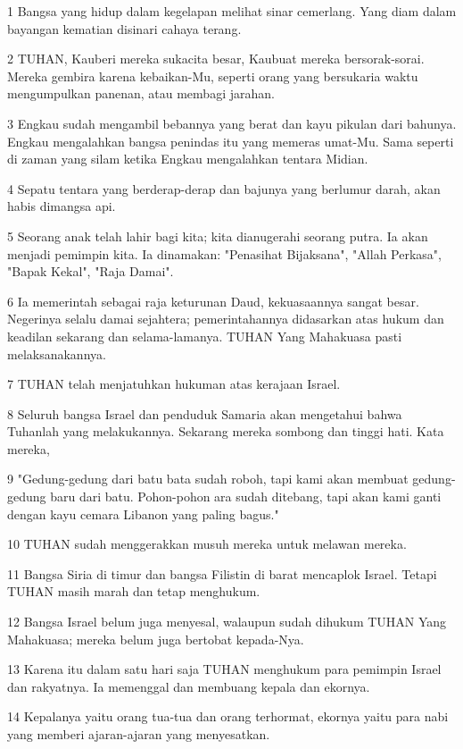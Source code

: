 \par 1 Bangsa yang hidup dalam kegelapan melihat sinar cemerlang. Yang diam dalam bayangan kematian disinari cahaya terang.
\par 2 TUHAN, Kauberi mereka sukacita besar, Kaubuat mereka bersorak-sorai. Mereka gembira karena kebaikan-Mu, seperti orang yang bersukaria waktu mengumpulkan panenan, atau membagi jarahan.
\par 3 Engkau sudah mengambil bebannya yang berat dan kayu pikulan dari bahunya. Engkau mengalahkan bangsa penindas itu yang memeras umat-Mu. Sama seperti di zaman yang silam ketika Engkau mengalahkan tentara Midian.
\par 4 Sepatu tentara yang berderap-derap dan bajunya yang berlumur darah, akan habis dimangsa api.
\par 5 Seorang anak telah lahir bagi kita; kita dianugerahi seorang putra. Ia akan menjadi pemimpin kita. Ia dinamakan: "Penasihat Bijaksana", "Allah Perkasa", "Bapak Kekal", "Raja Damai".
\par 6 Ia memerintah sebagai raja keturunan Daud, kekuasaannya sangat besar. Negerinya selalu damai sejahtera; pemerintahannya didasarkan atas hukum dan keadilan sekarang dan selama-lamanya. TUHAN Yang Mahakuasa pasti melaksanakannya.
\par 7 TUHAN telah menjatuhkan hukuman atas kerajaan Israel.
\par 8 Seluruh bangsa Israel dan penduduk Samaria akan mengetahui bahwa Tuhanlah yang melakukannya. Sekarang mereka sombong dan tinggi hati. Kata mereka,
\par 9 "Gedung-gedung dari batu bata sudah roboh, tapi kami akan membuat gedung-gedung baru dari batu. Pohon-pohon ara sudah ditebang, tapi akan kami ganti dengan kayu cemara Libanon yang paling bagus."
\par 10 TUHAN sudah menggerakkan musuh mereka untuk melawan mereka.
\par 11 Bangsa Siria di timur dan bangsa Filistin di barat mencaplok Israel. Tetapi TUHAN masih marah dan tetap menghukum.
\par 12 Bangsa Israel belum juga menyesal, walaupun sudah dihukum TUHAN Yang Mahakuasa; mereka belum juga bertobat kepada-Nya.
\par 13 Karena itu dalam satu hari saja TUHAN menghukum para pemimpin Israel dan rakyatnya. Ia memenggal dan membuang kepala dan ekornya.
\par 14 Kepalanya yaitu orang tua-tua dan orang terhormat, ekornya yaitu para nabi yang memberi ajaran-ajaran yang menyesatkan.
